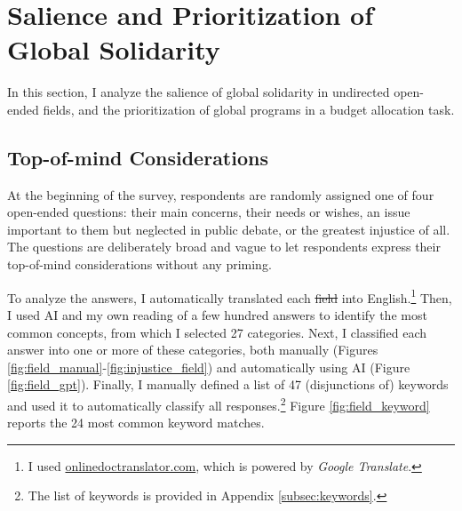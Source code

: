 \documentclass[12pt,english]{article}
\makeatletter
\providecommand{\DIFaddtex}[1]{{\protect\color{blue}\uwave{#1}}} %
\providecommand{\DIFdeltex}[1]{{\protect\color{red}\sout{#1}}} %
\providecommand{\DIFaddbegin}{} %
\providecommand{\DIFaddend}{} %
\providecommand{\DIFdelbegin}{} %
\providecommand{\DIFdelend}{} %
\providecommand{\DIFadd}[1]{\texorpdfstring{\DIFaddtex{#1}}{#1}} %
\providecommand{\DIFdel}[1]{\texorpdfstring{\DIFdeltex{#1}}{}} %
\providecommand{\DIFscaledelfig}{0.5}
\newlength{\DIFdelgraphicswidth} %
\newlength{\DIFdelgraphicsheight} %
\providecommand{\DIFaddincludegraphics}[2][]{{\color{blue}\fbox{\DIFOincludegraphics[#1]{#2}}}} %
\providecommand{\DIFdelincludegraphics}[2][]{%
\sbox{\DIFdelgraphicsbox}{\DIFOincludegraphics[#1]{#2}}%
\settoboxwidth{\DIFdelgraphicswidth}{\DIFdelgraphicsbox} %
\settoboxtotalheight{\DIFdelgraphicsheight}{\DIFdelgraphicsbox} %
\scalebox{\DIFscaledelfig}{%
\parbox[b]{\DIFdelgraphicswidth}{\usebox{\DIFdelgraphicsbox}\\[-\baselineskip] \rule{\DIFdelgraphicswidth}{0em}}\llap{\resizebox{\DIFdelgraphicswidth}{\DIFdelgraphicsheight}{%
\setlength{\unitlength}{\DIFdelgraphicswidth}%
\begin{picture}(1,1)%
\thicklines\linethickness{2pt} %
{\color[rgb]{1,0,0}\put(0,0){\framebox(1,1){}}}%
{\color[rgb]{1,0,0}\put(0,0){\line( 1,1){1}}}%
{\color[rgb]{1,0,0}\put(0,1){\line(1,-1){1}}}%
\end{picture}%
}\hspace*{3pt}}} %
} %
\DeclareRobustCommand{\DIFaddbegin}{\DIFOaddbegin \let\includegraphics\DIFaddincludegraphics} %
\DeclareRobustCommand{\DIFaddend}{\DIFOaddend \let\includegraphics\DIFOincludegraphics} %
\DeclareRobustCommand{\DIFdelbegin}{\DIFOdelbegin \let\includegraphics\DIFdelincludegraphics} %
\DeclareRobustCommand{\DIFdelend}{\DIFOaddend \let\includegraphics\DIFOincludegraphics} %
\let\sout@orig\sout %
\renewcommand{\sout}[1]{\ifmmode\text{\sout@orig{\ensuremath{#1}}}\else\sout@orig{#1}\fi} %
\makeatother
\begin{document}
\section{Salience and Prioritization of Global Solidarity\label{sec:salience}}
In this section, I analyze the salience of global solidarity in undirected open-ended fields, and the prioritization of global programs in a budget allocation task.

\subsection{Top-of-mind Considerations}\label{subsec:considerations}

At the beginning of the survey, respondents are randomly assigned one of four open-ended questions: their main concerns, their needs or wishes, an issue important to them but neglected in public debate, or the greatest injustice of all. The questions are deliberately broad and vague to let respondents express their top-of-mind considerations without any priming. 

To analyze the answers, I automatically translated each \DIFdelbegin \DIFdel{field }\DIFdelend \DIFaddbegin \DIFadd{answer }\DIFaddend into English.\footnote{I used \href{https://www.onlinedoctranslator.com/en/translationform}{onlinedoctranslator.com}, which is powered by \textit{Google Translate}.} 
Then, I used AI and my own reading of a few hundred answers to identify the most common concepts, from which I selected 27 categories. Next, I classified each answer into one or more of these categories, both manually (Figures \ref{fig:field_manual}-\ref{fig:injustice_field}) and automatically using AI (Figure \ref{fig:field_gpt}). Finally, I manually defined a list of 47 (disjunctions of) keywords and used it to automatically classify all responses.\footnote{The list of keywords is provided in Appendix \ref{subsec:keywords}.} Figure \ref{fig:field_keyword} reports the 24 most common keyword matches. 
\end{document}

